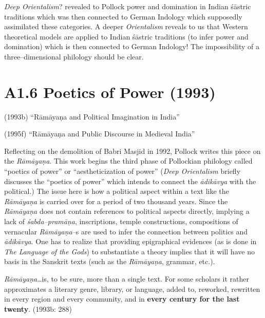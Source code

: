 {{\textit{Deep Orientalism}? revealed to Pollock power and domination in Indian śāstric traditions which was then connected to German Indology which supposedly assimilated these categories. A deeper\textit{ Orientalism} reveals to us that Western theoretical models are applied to Indian śāstric traditions (to infer power and domination) which is then connected to German Indology! The impossibility of a three–dimensional philology should be clear.

\vspace {-.4cm}

\section*{A1.6 Poetics of Power (1993)}

\vspace {-.2cm}

(1993b) “Rāmāyaṇa and Political Imagination in India”

(1995f) “Rāmāyaṇa and Public Discourse in Medieval India”

Reflecting on the demolition of Babri Masjid in 1992, Pollock writes this piece on the \textit{Rāmāyaṇa}. This work begins the third phase of Pollockian philology called “poetics of power” or “aestheticization of power” (\textit{Deep Orientalism} briefly discusses the “poetics of power” which intends to connect the \textit{ādikāvya }with the political.) The issue here is how a political aspect within a text like the \textit{Rāmāyaṇa} is carried over for a period of two thousand years. Since the \textit{Rāmāyaṇa} does not contain references to political aspects directly, implying a lack of \textit{śabda–pramāṇa}, inscriptions, temple constructions, compositions of vernacular \textit{Rāmāyaṇa}–s are used to infer the connection between politics and \textit{ādikāvya}. One has to realize that providing epigraphical evidences (as is done in \textit{The Language of the Gods}) to substantiate a theory implies that it will have no basis in the Sanskrit texts (such as the \textit{Rāmāyaṇa}, grammar, etc.).

\begin{myquote}
\textit{Rāmāyaṇa}…is, to be sure, more than a single text. For some scholars it rather approximates a literary genre, library, or language, added to, reworked, rewritten in every region and every community, and in \textbf{every century for the last twenty}. (1993b: 288)
\end{myquote}

}}
